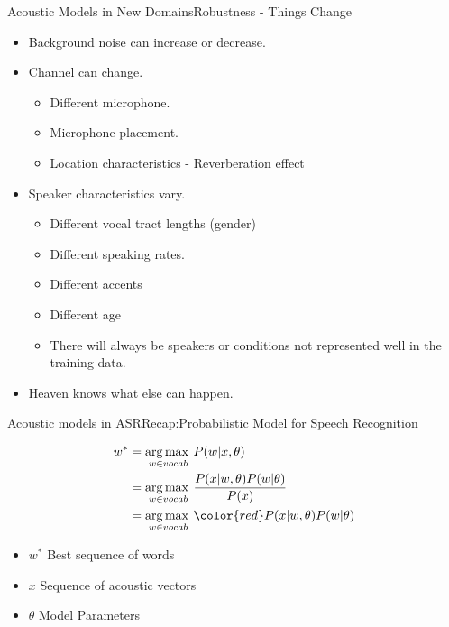 \begin{frame}{Acoustic Models in New Domains}{Robustness - Things Change}

\begin{itemize}
\item Background noise can increase or decrease.
\item  Channel can change.
\begin{itemize}
  \item Different microphone.
  \item Microphone placement.
  \item Location characteristics - Reverberation effect
\end{itemize}
\item Speaker characteristics vary.
\begin{itemize}
  \item Different vocal tract lengths (gender)
  \item Different speaking rates.
  \item Different accents
  \item Different age
\item There will always be speakers or conditions not represented well in the training data.
\end{itemize}
\item Heaven knows what else can happen.
\end{itemize}

\end{frame}


\begin{frame} {Acoustic models in ASR}{Recap:Probabilistic Model for Speech Recognition}

\begin{align*}
w^* & = \argmax_{w \in vocab} P(w | x, \theta) \\
       & = \argmax_{w \in vocab} \frac{P(x | w, \theta) P(w | \theta)} { P(x)} \\
       & = \argmax_{w \in vocab} {\color{red} P(x | w, \theta) }  P(w | \theta) \\
\end{align*}

\begin{itemize}
\item $w^*$  Best sequence of words
\item $x$ Sequence of acoustic vectors
\item $\theta$  Model Parameters
\end{itemize}
\end{frame}


